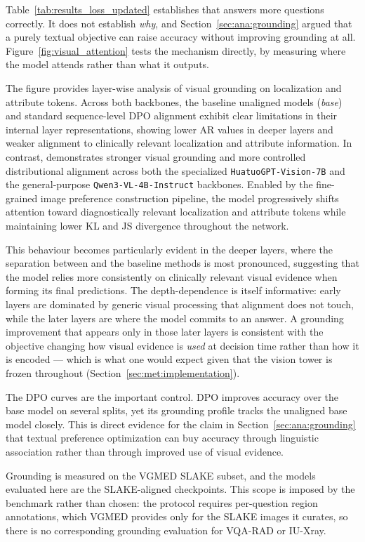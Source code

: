 Table~\ref{tab:results_loss_updated} establishes that \ourloss{} answers more questions correctly. It does not establish \emph{why}, and Section~\ref{sec:ana:grounding} argued that a purely textual objective can raise accuracy without improving grounding at all. Figure~\ref{fig:visual_attention} tests the mechanism directly, by measuring where the model attends rather than what it outputs.

The figure provides layer-wise analysis of visual grounding on localization and attribute tokens. Across both backbones, the baseline unaligned models (\textit{base}) and standard sequence-level DPO alignment exhibit clear limitations in their internal layer representations, showing lower AR values in deeper layers and weaker alignment to clinically relevant localization and attribute information. In contrast, \ourloss{} demonstrates stronger visual grounding and more controlled distributional alignment across both the specialized \texttt{HuatuoGPT-Vision-7B} and the general-purpose \texttt{Qwen3-VL-4B-Instruct} backbones. Enabled by the fine-grained image preference construction pipeline, the model progressively shifts attention toward diagnostically relevant localization and attribute tokens while maintaining lower KL and JS divergence throughout the network.

This behaviour becomes particularly evident in the deeper layers, where the separation between \ourloss{} and the baseline methods is most pronounced, suggesting that the model relies more consistently on clinically relevant visual evidence when forming its final predictions. The depth-dependence is itself informative: early layers are dominated by generic visual processing that alignment does not touch, while the later layers are where the model commits to an answer. A grounding improvement that appears only in those later layers is consistent with the objective changing how visual evidence is \emph{used} at decision time rather than how it is encoded --- which is what one would expect given that the vision tower is frozen throughout (Section~\ref{sec:met:implementation}).

The DPO curves are the important control. DPO improves accuracy over the base model on several splits, yet its grounding profile tracks the unaligned base model closely. This is direct evidence for the claim in Section~\ref{sec:ana:grounding} that textual preference optimization can buy accuracy through linguistic association rather than through improved use of visual evidence.

Grounding is measured on the VGMED SLAKE subset, and the models evaluated here are the SLAKE-aligned checkpoints. This scope is imposed by the benchmark rather than chosen: the protocol requires per-question region annotations, which VGMED provides only for the SLAKE images it curates, so there is no corresponding grounding evaluation for VQA-RAD or IU-Xray.

